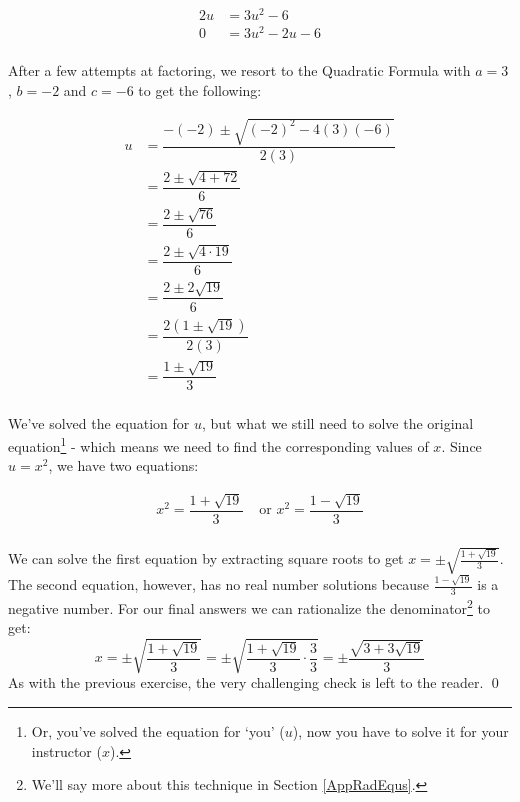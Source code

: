 \begin{ex}
\begin{enumerate}
\begin{align*}
2u & = 3u^2 - 6 \\
0 & = 3u^2 - 2u - 6 \tag{Subtract $2u$} \\
\end{align*}

After a few attempts at factoring, we resort to the Quadratic Formula with $a = 3$, $b = -2$ and $c = -6$ to get the following:

\begin{align*}
u & = \dfrac{-(-2) \pm \sqrt{(-2)^2 - 4(3)(-6)}}{2(3)} \\
& = \dfrac{2 \pm \sqrt{4 + 72}}{6} \\
& = \dfrac{2 \pm \sqrt{76}}{6} \\ 
& = \dfrac{2 \pm \sqrt{4 \cdot 19}}{6}  \\ 
& = \dfrac{2 \pm 2\sqrt{19}}{6} \tag{Properties of Radicals} \\ 
& = \dfrac{2(1 \pm \sqrt{19})}{2(3)} \tag{Factor} \\ 
& = \dfrac{1 \pm \sqrt{19}}{3} \tag{Reduce} \\
\end{align*}

We've solved the equation for $u$, but what we still need to solve the original equation\footnote{Or, you've solved the equation for `you' ($u$), now you have to solve it for your instructor ($x$).} - which means we need to find the corresponding values of $x$.  Since $u = x^2$, we have two equations:

\begin{align*}
x^2  =\dfrac{1 + \sqrt{19}}{3} & \text{ or } x^2  =\dfrac{1 - \sqrt{19}}{3} \\
\end{align*}

We can solve the first equation by extracting square roots to get  $x = \pm \sqrt{\frac{1 + \sqrt{19}}{3}}$.  The second equation, however, has no real number solutions because $\frac{1 - \sqrt{19}}{3}$ is a negative number.  For our final answers we can rationalize the denominator\footnote{We'll say more about this technique in Section \ref{AppRadEqus}.} to get: \[ x = \pm \sqrt{\dfrac{1 + \sqrt{19}}{3}} = \pm \sqrt{\dfrac{1 + \sqrt{19}}{3} \cdot \dfrac{3}{3}} = \pm \dfrac{\sqrt{3 + 3\sqrt{19}}}{3} \] As with the previous exercise, the very challenging check is left to the reader. \qed

\end{enumerate}

\end{ex}

